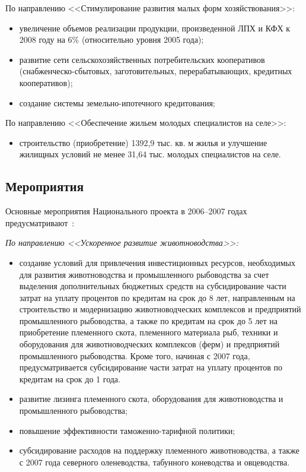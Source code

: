 \documentclass[article, 12pt, russian, oneside]{ncc}
\begin{document}
По направлению <<Стимулирование развития малых форм хозяйствования>>:

\begin{itemize}
\item увеличение объемов реализации продукции, произведенной ЛПХ и КФХ
  к 2008 году на 6\% (относительно уровня 2005 года);
\item развитие сети сельскохозяйственных потребительских кооперативов \linebreak
  (снаб\-жен\-чес\-ко-сбытовых, заготовительных, перерабатывающих, кредитных
  кооперативов);
\item создание системы земельно-ипотечного кредитования;
\end{itemize}

По направлению <<Обеспечение жильем молодых специалистов на селе>>:

\begin{itemize}
\item строительство (приобретение) 1392,9 тыс. кв. м жилья и улучшение
  жилищных условий не менее 31,64 тыс. молодых специалистов на селе.
\end{itemize}


\subsection{Мероприятия}

Основные мероприятия Национального проекта в 2006--2007 годах
предусматривают~\cite{APK_Waitings}:

\emph{По направлению <<Ускоренное развитие животноводства>>:}

\begin{itemize}
\item создание условий для привлечения инвестиционных ресурсов,
  необходимых для развития животноводства и промышленного рыбоводства
  за счет выделения дополнительных бюджетных средств на субсидирование
  части затрат на уплату процентов по кредитам на срок до 8 лет,
  направленным на строительство и модернизацию животноводческих
  комплексов и предприятий промышленного рыбоводства, а также по
  кредитам на срок до 5 лет на приобретение племенного скота,
  племенного материала рыб, техники и оборудования для
  животноводческих комплексов (ферм) и предприятий промышленного
  рыбоводства. Кроме того, начиная с 2007 года, предусматривается
  субсидирование части затрат на уплату процентов по кредитам на срок
  до 1 года.
\item развитие лизинга племенного скота, оборудования для
  животноводства и промышленного рыбоводства;
\item повышение эффективности таможенно-тарифной политики;
\item субсидирование расходов на поддержку племенного животноводства,
  а также с 2007 года северного оленеводства, табунного коневодства и
  овцеводства.
\end{itemize}
\end{document}
